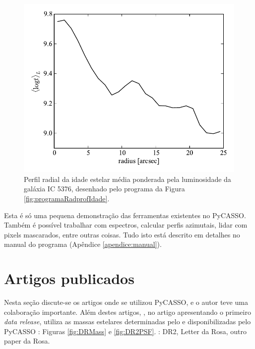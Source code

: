 \begin{figure}
	\includegraphics{figuras/radprof-idade}
	\caption[Perfil radial da idade estelar média da galáxia IC 5376] {Perfil
	radial da idade estelar média ponderada pela luminosidade da galáxia IC
	5376, desenhado pelo programa da Figura \ref{fig:programaRadprofIdade}.}
	\label{fig:radprofIdade}
\end{figure}

Esta é só uma pequena demonstração das ferramentas existentes no PyCASSO. Também
é possível trabalhar com espectros, calcular perfis azimutais, lidar com pixels
mascarados, entre outras coisas. Tudo isto está descrito em detalhes no manual
do programa (Apêndice \ref{apendice:manual}).



\section{Artigos publicados}
\label{sec:pycasso:art}

Nesta seção discute-se os artigos onde se utilizou PyCASSO, e o autor teve uma
colaboração importante. Além destes artigos, \citet{Husemann2013}, no artigo
apresentando o primeiro {\em data release}, utiliza as massas estelares
determinadas pelo \starlight e disponibilizadas pelo PyCASSO
\TODO: Figuras \ref{fig:DRMass} e \ref{fig:DR2PSF}. \TODO:
DR2, Letter da Rosa, outro paper da Rosa.



